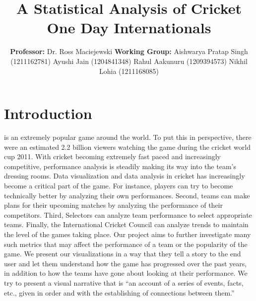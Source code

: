\documentclass[10pt,journal,compsoc]{IEEEtran}
\title{A Statistical Analysis of Cricket\\One Day Internationals}
\author{\textbf{Professor:} Dr. Ross Maciejewski 
\linebreak 
\linebreak
\textbf{Working Group:}
\linebreak
Aishwarya Pratap Singh (1211162781) \quad Ayushi Jain (1204841348)
\linebreak
Rahul Aakunuru (1209394573) \quad Nikhil Lohia (1211168085)}
\begin{document}

\maketitle

\section{Introduction}
 is an extremely popular game around the world. To put this in perspective, there were an estimated 2.2 billion viewers watching the game during the cricket world cup 2011. With cricket becoming extremely fast paced and increasingly competitive, performance analysis is steadily making its way into the team’s dressing rooms. Data visualization and data analysis in cricket has increasingly become a critical part of the game. For instance, players can try to become technically better by analyzing their own performances. Second, teams can make plans for their upcoming matches by analyzing the performance of their competitors. Third, Selectors can analyze team performance to select appropriate teams. Finally, the International Cricket Council can analyze trends to maintain the level of the games taking place. Our project aims to further investigate many such metrics that may affect the performance of a team or the popularity of the game. We present our visualizations in a way that they tell a story to the end user and let them understand how the game has progressed over the past years, in addition to how the teams have gone about looking at their performance. We try to present a visual narrative that is ``an account of a series of events, facts, etc., given in order and with the establishing of connections between them.''\cite{paper1}
\end{document}
